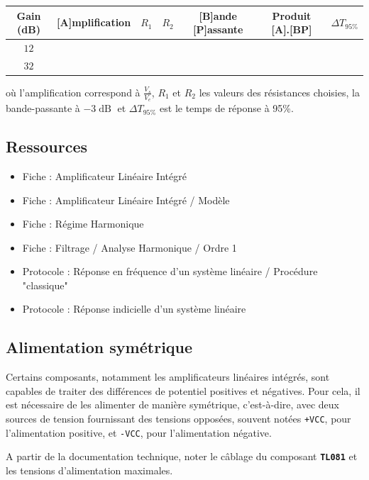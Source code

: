 \begin{center}
\begin{tabular}{|c|c|c|c|c|c|c|}
  \hline
  Gain (dB) & [A]mplification & $R_1$ & $R_2$ & [B]ande [P]assante & Produit [A].[BP] & $\Delta{}T_{95\%}$\\
  \hline
  $12$ &  &  &  & & & \\
  \hline
  $32$ &  &  &  & & & \\
  \hline
\end{tabular}
\end{center}

où l'amplification correspond à $\frac{V_s}{V_e}$, $R_1$ et $R_2$ les valeurs des résistances choisies, la bande-passante à $-3\operatorname{dB}$ et $\Delta{}T_{95\%}$ est le temps de réponse à 95\%.



\subsection{Ressources}

\begin{itemize}
	\item Fiche : Amplificateur Linéaire Intégré
	\item Fiche : Amplificateur Linéaire Intégré / Modèle
	\item Fiche : Régime Harmonique
	\item Fiche : Filtrage / Analyse Harmonique / Ordre 1
	\item Protocole : Réponse en fréquence d'un système linéaire / Procédure "classique"
	\item Protocole : Réponse indicielle d'un système linéaire
\end{itemize}


\clearpage
\subsection{Alimentation symétrique}
Certains composants, notamment les amplificateurs linéaires intégrés, sont capables de traiter des différences de potentiel positives et négatives. Pour cela, il est nécessaire de les alimenter de manière symétrique, c'est-à-dire, avec deux sources de tension fournissant des tensions opposées, souvent notées \texttt{+VCC}, pour l'alimentation positive, et \texttt{-VCC}, pour l'alimentation négative. 

\Quest A partir de la documentation technique, noter le câblage du composant \textbf{\texttt{TL081}} et les tensions d'alimentation maximales. 

